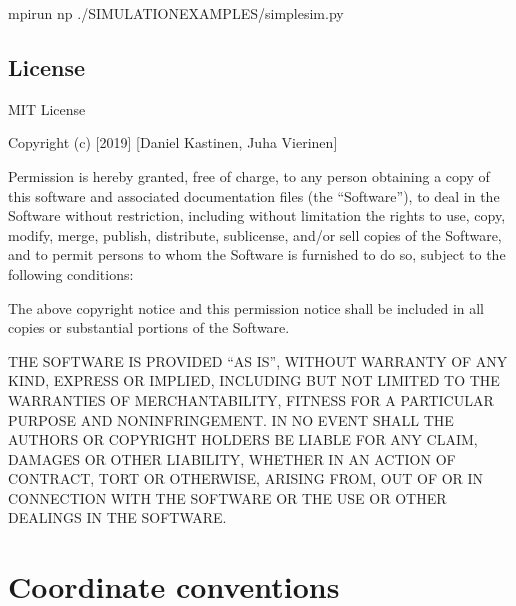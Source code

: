 \documentclass[letterpaper,10pt,english]{sphinxmanual}
\begin{document}
%
\begin{sphinxVerbatim}[commandchars=\\\{\}]
mpirun \PYGZhy{}np  ./SIMULATION\PYGZus{}EXAMPLES/simple\PYGZus{}sim.py
\end{sphinxVerbatim}


\section{License}
\label{\detokenize{introduction/introduction:license}}
MIT License

Copyright (c) {[}2019{]} {[}Daniel Kastinen, Juha Vierinen{]}

Permission is hereby granted, free of charge, to any person obtaining a copy
of this software and associated documentation files (the “Software”), to deal
in the Software without restriction, including without limitation the rights
to use, copy, modify, merge, publish, distribute, sublicense, and/or sell
copies of the Software, and to permit persons to whom the Software is
furnished to do so, subject to the following conditions:

The above copyright notice and this permission notice shall be included in all
copies or substantial portions of the Software.

THE SOFTWARE IS PROVIDED “AS IS”, WITHOUT WARRANTY OF ANY KIND, EXPRESS OR
IMPLIED, INCLUDING BUT NOT LIMITED TO THE WARRANTIES OF MERCHANTABILITY,
FITNESS FOR A PARTICULAR PURPOSE AND NONINFRINGEMENT. IN NO EVENT SHALL THE
AUTHORS OR COPYRIGHT HOLDERS BE LIABLE FOR ANY CLAIM, DAMAGES OR OTHER
LIABILITY, WHETHER IN AN ACTION OF CONTRACT, TORT OR OTHERWISE, ARISING FROM,
OUT OF OR IN CONNECTION WITH THE SOFTWARE OR THE USE OR OTHER DEALINGS IN THE
SOFTWARE.


\chapter{Coordinate conventions}
\label{\detokenize{introduction/conventions:coordinate-conventions}}\label{\detokenize{introduction/conventions::doc}}
\end{document}
